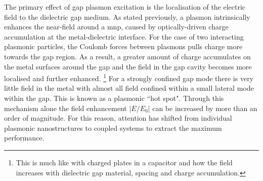 \documentclass{article}
\begin{document}
The primary effect of gap plasmon excitation is the localisation of the electric field to the dielectric gap medium. As stated previously, a plasmon intrinsically enhances the near-field around a \gls{mnp}, caused by optically-driven charge accumulation at the metal-dielectric interface. For the case of two interacting plasmonic particles, the Coulomb forces between plasmons pulls charge more towards the gap region. As a result, a greater amount of charge accumulates on the metal surfaces around the gap and the field in the gap cavity becomes more localised and further enhanced.%
\footnote{This is much like with charged plates in a capacitor and how the field increases with dielectric gap material, spacing and charge accumulation.}
For a strongly confined gap mode there is very little field in the metal with almost all field confined within a small lateral mode within the gap. This is known as a plasmonic ``hot spot". Through this mechanism alone the field enhancement $\left|E/E_0\right|$ can be increased by more than an order of magnitude. For this reason, attention has shifted from individual plasmonic nanostructures to coupled systems to extract the maximum performance.
\end{document}

